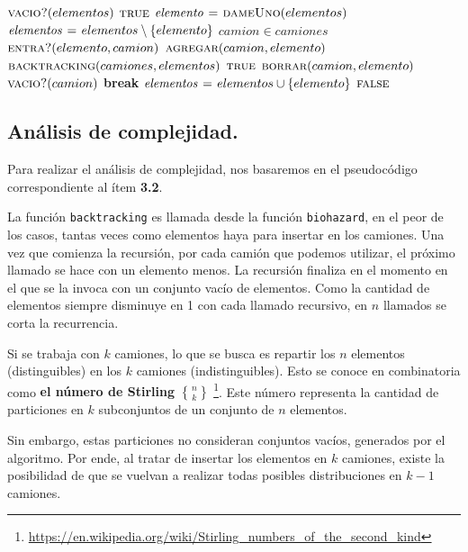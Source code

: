 \vspace*{0.5cm}


\begin{codebox}
\li \If $\textnormal{\scshape vacio?}(elementos)$ \Then
\li   \Return $\textnormal{\scshape true}$
    \End
\li $\id{elemento} \gets \proc{dameUno}(elementos)$
\li $\id{elementos} \gets elementos \setminus \{elemento\}$
\li \For $camion \in camiones$ \Do
\li   \If $\textnormal{\scshape entra?}(elemento, camion)$ \Then
\li     $\textnormal{\scshape agregar}(camion, elemento)$
\li     \If $\textnormal{\scshape backtracking}(camiones, elementos)$ \Then
\li       \Return $\textnormal{\scshape true}$
\li     \Else
\li       $\textnormal{\scshape borrar}(camion, elemento)$
\li       \If $\textnormal{\scshape vacio?}(camion)$ \Then
\li         \textbf{break}
          \End
        \End
      \End
    \End
\li $\id{elementos} \gets elementos \cup \{elemento\}$
\li \Return $\textnormal{\scshape false}$
\end{codebox}



\newpage
\subsection{Análisis de complejidad.}

\vspace*{0.3cm}

Para realizar el análisis de complejidad, nos basaremos en el pseudocódigo
correspondiente al ítem \textbf{3.2}.

La función \verb|backtracking| es llamada desde la función \verb|biohazard|,
en el peor de los casos, tantas veces como elementos haya para insertar en
los camiones. Una vez que comienza la recursión, por cada camión que podemos
utilizar, el próximo llamado se hace con un elemento menos. La recursión
finaliza en el momento en el que se la invoca con un conjunto vacío de
elementos. Como la cantidad de elementos siempre disminuye en 1 con cada
llamado recursivo, en $n$ llamados se corta la recurrencia.

Si se trabaja con $k$ camiones, lo que se busca es repartir los $n$
elementos (distinguibles) en los $k$ camiones (indistinguibles). Esto se
conoce en combinatoria como \textbf{el número de Stirling ${n \brace k}$}
\footnote{\url{https://en.wikipedia.org/wiki/Stirling_numbers_of_the_second_kind}}.
Este número representa la cantidad de
particiones en $k$ subconjuntos de un conjunto de $n$ elementos.

Sin embargo, estas particiones no consideran conjuntos vacíos, generados por
el algoritmo. Por ende, al tratar de insertar los elementos en $k$ camiones,
existe la posibilidad de que se vuelvan a realizar todas posibles
distribuciones en $k - 1$ camiones.

